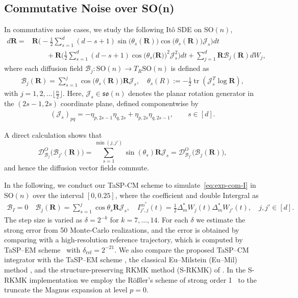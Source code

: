 \documentclass[11pt, a4paper, onecolumn]{article}
\newcommand{\SOn}{\mathrm{SO}(n)}
\newcommand{\DO}{\tg D^{O}}
\newcommand{\bfR}{\mathbf{R}}
\newcommand{\B}{\mathcal{B}}
\newcommand{\tg}[1]{\mathcal{#1}}
\newcommand{\ms}{{m^*}}
\newcommand{\Dms}{{\Delta^{*}_{m}}}
\newcommand{\Ijpjms}{ {I_{j',j}^{\ms}} }
\newcommand{\half}{{\frac{1}{2}}}
\DeclareMathOperator{\tr}{tr}
\newcommand{\Der}[4]{
  #1_{#2}\bigl(#3(#4)\bigr)
}
\newcommand{\DerDOjjp}[1]{\Der{\DO}{\B_j}{\B_{j'}}{#1}}
\newcommand{\DerDOjpj}[1]{\Der{\DO}{\B_{j'}}{\B_{j}}{#1}}
\begin{document}
\subsection{Commutative Noise over SO(n)}
In commutative noise cases, we study the following It\^o SDE on $\SOn$,
\begin{align}\label{eq:exp-com-I}
    d\bfR = & \bfR\Big(-\half\sum_{s=1}^{d}(d-s+1) \sin\big(\theta_s(\bfR)\big)\cos\big(\theta_s(\bfR)\big)  \tg J_s\Big)dt \\
    & \qquad + \bfR\Big(\half\sum_{s=1}^{d} (d-s+1)\cos\big(\theta_s\big(\bfR)\big)^2 \tg J^2_s\Big) dt +\sum_{j=1}^{d}\bfR\B_j(\bfR)dW_j,
\end{align}
where each diffusion field $\tg B_j : \mathrm{SO}(n) \to T_R\mathrm{SO}(n)$ is defined as
\begin{align*}
    \tg B_j(\bfR)= \sum_{s=1}^{j}\cos\big(\theta_s(\bfR)\big)\bfR\tg J_s, \quad
    \theta_s(R) := -\half \tr(\tg J_s^T \log \bfR), 
\end{align*}
with $j =1 ,2, \dots\lfloor \tfrac{n}{2} \rfloor$. Here, $\tg J_s \in \mathfrak{so}(n)$ denotes the planar rotation generator in the $(2s-1,2s)$ coordinate plane, defined componentwise by
\begin{align*}
  (\tg J_s)_{pq} = -\eta_{p,2s-1}\eta_{q,2s} + \eta_{p,2s}\eta_{q,2s-1}, \qquad s \in [d].
\end{align*}

A direct calculation shows that
$$\DerDOjjp{\bfR} = \sum_{s=1}^{\min(j,j')} \sin(\theta_s) \bfR \tg J_s = \DerDOjpj{\bfR},$$ and hence the diffusion vector fields commute.

In the following, we conduct our TaSP-CM scheme to simulate~\cref{eq:exp-com-I} in $\mathrm{SO}(n)$ over the interval $[0,0.25]$, where the coefficient and double Intergral as
\begin{align*}
\B_I =  0 \quad \tg B_j(\bfR)= \sum_{s=1}^{j}\cos\theta_s\bfR\tg J_s, \quad \Ijpjms(t) = \half \Dms W_j(t)\Dms W_{j'}(t),
 \quad j,j' \in [d].
\end{align*}
The step size is varied as $\delta = 2^{-k}$ for $k = 7,\ldots,14$.  For each $\delta$ we estimate the strong error from 50 Monte-Carlo realizations, and the error is obtained by comparing with a high-resolution reference trajectory, which is computed by TaSP–EM scheme~\cite{wang2025tangent} with $\delta_{\text{ref}} = 2^{-21}$.  We also compare the proposed TaSP–CM integrator with the TaSP–EM scheme \cite{wang2025tangent}, the classical Eu–Milstein (Eu–Mil) method \cite{mil1975approximate}, and the structure-preserving RKMK method (S-RKMK) of \cite{muniz2023strong}.  In the S-RKMK implementation we employ the R\"o\ss{}ler’s scheme of strong order 1~\cite{rossler2010strong} to the truncate the Magnus expansion at level $p = 0$.
\end{document}
